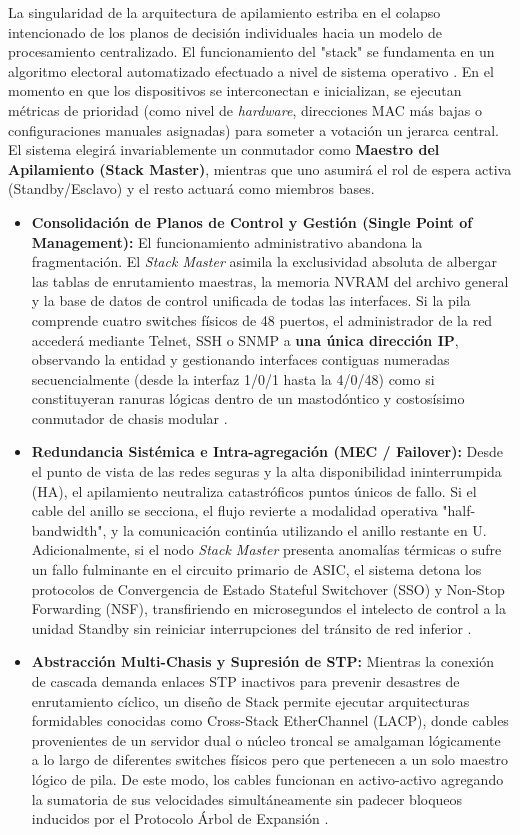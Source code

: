 \documentclass[a4paper,12pt]{article}
\begin{document}
La singularidad de la arquitectura de apilamiento estriba en el colapso intencionado de los planos de decisión individuales hacia un modelo de procesamiento centralizado. El funcionamiento del "stack" se fundamenta en un algoritmo electoral automatizado efectuado a nivel de sistema operativo \cite{kurose2017}. En el momento en que los dispositivos se interconectan e inicializan, se ejecutan métricas de prioridad (como nivel de \textit{hardware}, direcciones MAC más bajas o configuraciones manuales asignadas) para someter a votación un jerarca central. El sistema elegirá invariablemente un conmutador como \textbf{Maestro del Apilamiento (Stack Master)}, mientras que uno asumirá el rol de espera activa (Standby/Esclavo) y el resto actuará como miembros bases.

\begin{itemize}
    \item \textbf{Consolidación de Planos de Control y Gestión (Single Point of Management):} El funcionamiento administrativo abandona la fragmentación. El \textit{Stack Master} asimila la exclusividad absoluta de albergar las tablas de enrutamiento maestras, la memoria NVRAM del archivo general y la base de datos de control unificada de todas las interfaces. Si la pila comprende cuatro switches físicos de 48 puertos, el administrador de la red accederá mediante Telnet, SSH o SNMP a \textbf{una única dirección IP}, observando la entidad y gestionando interfaces contiguas numeradas secuencialmente (desde la interfaz 1/0/1 hasta la 4/0/48) como si constituyeran ranuras lógicas dentro de un mastodóntico y costosísimo conmutador de chasis modular \cite{stallings2014}.
    \item \textbf{Redundancia Sistémica e Intra-agregación (MEC / Failover):} Desde el punto de vista de las redes seguras y la alta disponibilidad ininterrumpida (HA), el apilamiento neutraliza catastróficos puntos únicos de fallo. Si el cable del anillo se secciona, el flujo revierte a modalidad operativa "half-bandwidth", y la comunicación continúa utilizando el anillo restante en U. Adicionalmente, si el nodo \textit{Stack Master} presenta anomalías térmicas o sufre un fallo fulminante en el circuito primario de ASIC, el sistema detona los protocolos de Convergencia de Estado Stateful Switchover (SSO) y Non-Stop Forwarding (NSF), transfiriendo en microsegundos el intelecto de control a la unidad Standby sin reiniciar interrupciones del tránsito de red inferior \cite{ieee8023}.
    \item \textbf{Abstracción Multi-Chasis y Supresión de STP:} Mientras la conexión de cascada demanda enlaces STP inactivos para prevenir desastres de enrutamiento cíclico, un diseño de Stack permite ejecutar arquitecturas formidables conocidas como Cross-Stack EtherChannel (LACP), donde cables provenientes de un servidor dual o núcleo troncal se amalgaman lógicamente a lo largo de diferentes switches físicos pero que pertenecen a un solo maestro lógico de pila. De este modo, los cables funcionan en activo-activo agregando la sumatoria de sus velocidades simultáneamente sin padecer bloqueos inducidos por el Protocolo Árbol de Expansión \cite{tanenbaum2021}.

\end{itemize}
\end{document}
